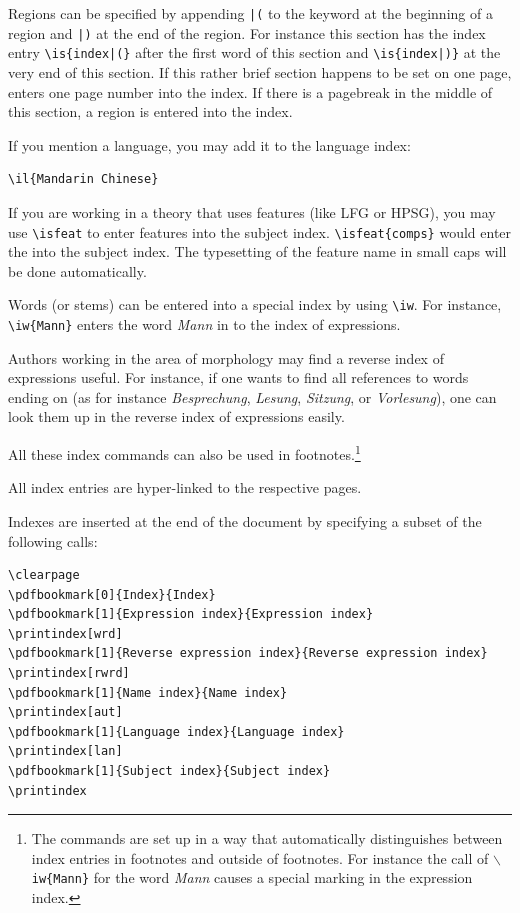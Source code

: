Regions can be specified by appending \verb+|(+ to the keyword at the beginning of a region and
\verb+|)+ at the end of the region. For instance this section has the index entry
\verb+\is{index|(}+ after the first word of this section and \verb+\is{index|)}+ at the very end of
this section. If this rather brief section happens to be set on one page, \latex enters one page
number into the index. If there is a pagebreak in the middle of this section, a region is entered
into the index.

If you mention a language, you may add it to the language index: 
\begin{verbatim}
\il{Mandarin Chinese}
\end{verbatim}
If you are working in a theory that uses features (like LFG or HPSG), you may use \verb+\isfeat+ to enter
features into the subject index. \verb+\isfeat{comps}+ would enter the \compsf into the subject
index. The typesetting of the feature name in {\sc small caps} will be done automatically.

Words (or stems) can be entered into a special index by using \verb+\iw+. For instance,
\verb+\iw{Mann}+ enters the word \emph{Mann} in to the index of expressions.

Authors working in the area of morphology may find a reverse index of expressions useful. For
instance, if one wants to find all references to words ending on  (as for instance \emph{Besprechung}, \emph{Lesung},
\emph{Sitzung}, or \emph{Vorlesung}), one can look them up
in the reverse index of expressions easily.

All these index commands can also be used in footnotes.\footnote{
  The commands are set up in a way that automatically distinguishes between index entries in
  footnotes and outside of footnotes. For instance the call of \texttt{$\backslash$iw\{Mann\}} for the word
  \emph{Mann} causes a special marking in the expression index.
}

All index entries are hyper-linked to the respective pages.

Indexes are inserted at the end of the document by specifying a subset of the following calls:
\begin{verbatim}
\clearpage
\pdfbookmark[0]{Index}{Index}
\pdfbookmark[1]{Expression index}{Expression index}
\printindex[wrd]
\pdfbookmark[1]{Reverse expression index}{Reverse expression index}
\printindex[rwrd]
\pdfbookmark[1]{Name index}{Name index}
\printindex[aut]
\pdfbookmark[1]{Language index}{Language index}
\printindex[lan]
\pdfbookmark[1]{Subject index}{Subject index}
\printindex
\end{verbatim}

